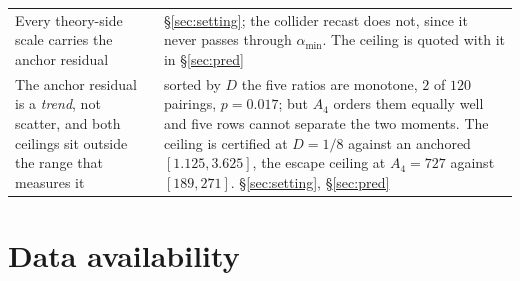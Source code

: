 \documentclass[11pt,a4paper]{article}
\newcommand{\amin}{\alpha_{\min}}
\begin{document}
\begin{longtable}{p{}p{}}
Every theory-side scale carries the anchor residual & \S\ref{sec:setting}; the collider recast
does not, since it never passes through $\amin$. The ceiling is quoted with it in
\S\ref{sec:pred}\\
The anchor residual is a \emph{trend}, not scatter, and both ceilings sit outside the range that
measures it & sorted by $D$ the five ratios are monotone, $2$ of $120$ pairings, $p=0.017$; but
$A_4$ orders them equally well and five rows cannot separate the two moments. The ceiling is
certified at $D=1/8$ against an anchored $[1.125,3.625]$, the escape ceiling at $A_4=727$ against
$[189,271]$. \S\ref{sec:setting}, \S\ref{sec:pred}\\
\bottomrule
\end{longtable}
\endgroup

\section*{Data availability}
\end{document}
